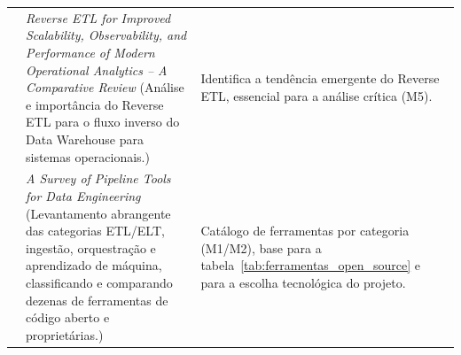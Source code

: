 \begin{longtable}{
    >{\raggedright\arraybackslash}p{2.6cm}
    >{\raggedright\arraybackslash}p{5.8cm}
    >{\raggedright\arraybackslash}p{4.8cm}
}
\rowcolor[gray]{0.96}
\cite[]{reverseetl2022} &
\textit{Reverse ETL for Improved Scalability, Observability, and Performance of Modern Operational Analytics – A Comparative Review} \newline
(Análise e importância do Reverse ETL para o fluxo inverso do Data Warehouse para sistemas operacionais.) &
Identifica a tendência emergente do Reverse ETL, essencial para a análise crítica (M5). \\


\rowcolor[gray]{0.96}
\cite[]{mbata2024survey} &
\textit{A Survey of Pipeline Tools for Data Engineering} \newline
(Levantamento abrangente das categorias ETL/ELT, ingest\~{a}o, orquestra\c{c}\~{a}o e aprendizado de m\'aquina, classificando e comparando dezenas de ferramentas de c\'odigo aberto e propriet\'arias.) &
Cat\'alogo de ferramentas por categoria (M1/M2), base para a tabela~\ref{tab:ferramentas_open_source} e para a escolha tecnol\'ogica do projeto. \\

\end{longtable}
